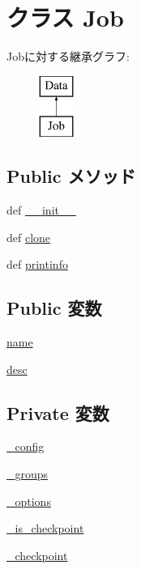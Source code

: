 \hypertarget{classm5_1_1util_1_1jobfile_1_1Job}{
\section{クラス Job}
\label{classm5_1_1util_1_1jobfile_1_1Job}
}
Jobに対する継承グラフ:\begin{figure}[H]
\begin{center}
\leavevmode
\includegraphics[height=2cm]{classm5_1_1util_1_1jobfile_1_1Job}
\end{center}
\end{figure}
\subsection*{Public メソッド}
\begin{DoxyCompactItemize}
\item 
def \hyperlink{classm5_1_1util_1_1jobfile_1_1Job_ac775ee34451fdfa742b318538164070e}{\_\-\_\-init\_\-\_\-}
\item 
def \hyperlink{classm5_1_1util_1_1jobfile_1_1Job_a4110248fff184e40b53c1cfa2bc3c649}{clone}
\item 
def \hyperlink{classm5_1_1util_1_1jobfile_1_1Job_a40bc1aa85be1c4ba18cd144234c53984}{printinfo}
\end{DoxyCompactItemize}
\subsection*{Public 変数}
\begin{DoxyCompactItemize}
\item 
\hyperlink{classm5_1_1util_1_1jobfile_1_1Job_ab74e6bf80237ddc4109968cedc58c151}{name}
\item 
\hyperlink{classm5_1_1util_1_1jobfile_1_1Job_aafc566bb08a9f46485e7238669581c2b}{desc}
\end{DoxyCompactItemize}
\subsection*{Private 変数}
\begin{DoxyCompactItemize}
\item 
\hyperlink{classm5_1_1util_1_1jobfile_1_1Job_ae59962abbe8dc3d47a44d7ec1f35af63}{\_\-config}
\item 
\hyperlink{classm5_1_1util_1_1jobfile_1_1Job_a9f92d6deaff1a0299428452ea47e01cc}{\_\-groups}
\item 
\hyperlink{classm5_1_1util_1_1jobfile_1_1Job_a7f9a85e66fca8983938e3ef12b102552}{\_\-options}
\item 
\hyperlink{classm5_1_1util_1_1jobfile_1_1Job_a7e3898763f063c1db75758a64bc6eb6b}{\_\-is\_\-checkpoint}
\item 
\hyperlink{classm5_1_1util_1_1jobfile_1_1Job_a3c6a36161a314474d5a6e96f5976ac11}{\_\-checkpoint}
\end{DoxyCompactItemize}


